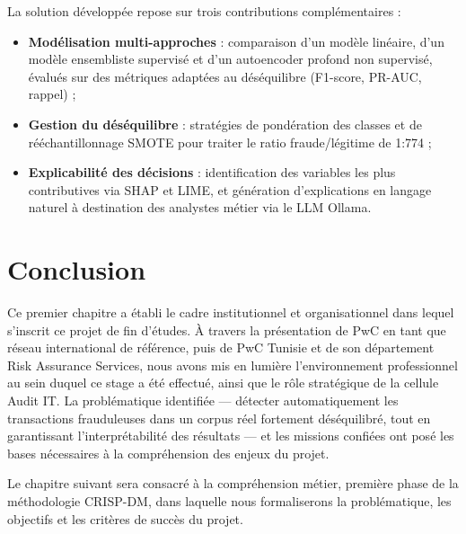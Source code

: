 La solution développée repose sur trois contributions complémentaires :

\begin{itemize}
  \item \textbf{Modélisation multi-approches} : comparaison d'un modèle linéaire, d'un
    modèle ensembliste supervisé et d'un autoencoder profond non supervisé, évalués sur
    des métriques adaptées au déséquilibre (F1-score, PR-AUC, rappel) ;
  \item \textbf{Gestion du déséquilibre} : stratégies de pondération des classes et de
    rééchantillonnage SMOTE pour traiter le ratio fraude/légitime de 1:774 ;
  \item \textbf{Explicabilité des décisions} : identification des variables les plus
    contributives via SHAP et LIME, et génération d'explications en langage naturel à
    destination des analystes métier via le LLM Ollama.
\end{itemize}

\section*{Conclusion}

Ce premier chapitre a établi le cadre institutionnel et organisationnel dans lequel s'inscrit
ce projet de fin d'études. À travers la présentation de PwC en tant que réseau international
de référence, puis de PwC Tunisie et de son département Risk Assurance Services, nous avons
mis en lumière l'environnement professionnel au sein duquel ce stage a été effectué, ainsi
que le rôle stratégique de la cellule Audit IT. La problématique identifiée --- détecter
automatiquement les transactions frauduleuses dans un corpus réel fortement déséquilibré,
tout en garantissant l'interprétabilité des résultats --- et les missions confiées ont posé
les bases nécessaires à la compréhension des enjeux du projet.

Le chapitre suivant sera consacré à la compréhension métier, première phase de la
méthodologie CRISP-DM, dans laquelle nous formaliserons la problématique, les objectifs
et les critères de succès du projet.
